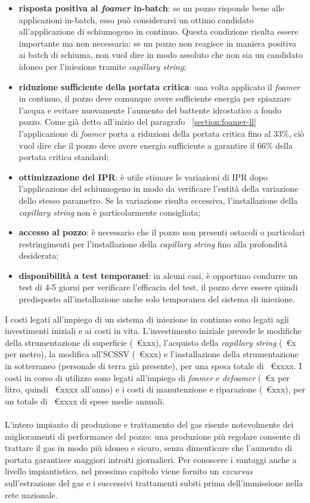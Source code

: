 \begin{itemize}
    \item \textbf{risposta positiva al \textit{foamer} in-batch}: se un pozzo risponde bene alle applicazioni in-batch, esso può considerarsi un ottimo candidato all'applicazione di schiumogeno in continuo. Questa condizione risulta essere importante ma non necessaria: se un pozzo non reagisce in maniera positiva ai batch di schiuma, non vuol dire in modo assoluto che non sia un candidato idoneo per l'iniezione tramite \textit{capillary string};
    \item \textbf{riduzione sufficiente della portata critica}:  una volta applicato il \textit{foamer} in continuo, il pozzo deve comunque avere sufficiente energia per spiazzare l'acqua e evitare nuovamente l'aumento del battente idrostatico a fondo pozzo. Come già detto all'inizio del paragrafo ~\ref{section:foamer-ll} l'applicazione di \textit{foamer} porta a riduzioni della portata critica fino al 33\%, ciò vuol dire che il pozzo deve avere energia sufficiente a garantire il 66\% della portata critica standard;
    \item \textbf{ottimizzazione del IPR}: è utile stimare le variazioni di IPR dopo l'applicazione del schiumogeno in modo da verificare l'entità della variazione dello stesso parametro. Se la variazione risulta eccessiva, l'installazione della \textit{capillary string} non è particolarmente consigliata;
    \item \textbf{accesso al pozzo}: è necessario che il pozzo non presenti ostacoli o particolari restringimenti per l'installazione della \textit{capillary string} fino alla profondità desiderata;
    \item \textbf{disponibilità a test temporanei}: in alcuni casi, è opportuno condurre un test di 4-5 giorni per verificare l'efficacia del test, il pozzo deve essere quindi predisposto all'installazione anche solo temporanea del sistema di iniezione.
\end{itemize}
I costi legati all'impiego di un sistema di iniezione in continuo sono legati agli investimenti iniziali e ai costi in vita. L'investimento iniziale prevede le modifiche della strumentazione di superficie (~€xxx), l'acquisto della \textit{capillary string} (~€x per metro), la modifica all'SCSSV (~€xxx) e l'installazione della strumentazione in sotterraneo (personale di terra già presente), per una spesa totale di ~€xxxx. I costi in corso di utilizzo sono legati all'impiego di \textit{foamer} e \textit{defoamer} (~€x per litro, quindi ~€xxxx all'anno) e i costi di manutenzione e riparazione (~€xxx), per un totale di ~€xxxx di spese medie annuali.  \\ \\
L'intero impianto di produzione e trattamento del gas risente notevolmente dei miglioramenti di performance del pozzo: una produzione più regolare consente di trattare il gas in modo più idoneo e sicuro, senza dimenticare che l'aumento di portata garantisce maggiori introiti giornalieri. Per conoscere i vantaggi anche a livello impiantistico, nel prossimo capitolo viene fornito un \textit{excursus} sull'estrazione del gas e i successivi trattamenti subiti prima dell'immissione nella rete nazionale.